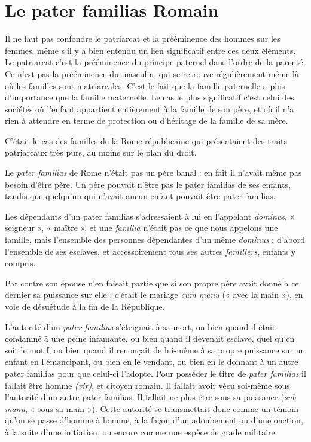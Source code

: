 \section{Le pater familias Romain}

Il ne faut pas confondre le patriarcat et la prééminence des hommes
sur les femmes, même s'il y a bien entendu un lien significatif entre
ces deux éléments. Le patriarcat c'est la prééminence du principe paternel
dans l'ordre de la parenté. Ce n'est pas la prééminence du masculin, qui
se retrouve régulièrement même là où les familles sont matriarcales. C'est
le fait que la famille paternelle a plus d'importance que la famille maternelle.
Le cas le plus significatif c'est celui des sociétés où l'enfant appartient
entièrement à la famille de son père, et où il n'a rien à attendre en
terme de protection ou d'héritage de la famille de sa mère.

C'était le cas des familles de la Rome républicaine qui présentaient
des traits patriarcaux très purs, au moins sur le plan du droit.

Le \emph{pater familias} de Rome n'était pas un père banal : en fait il n'avait
même pas besoin d'être père. Un père pouvait n'être pas le pater familias
de ses enfants, tandis que quelqu'un qui n'avait aucun enfant pouvait être
pater familias.

Les dépendants d'un pater familias s'adressaient à lui en l'appelant
\emph{dominus}, « seigneur », « maître », et une \emph{familia} n'était pas ce que nous
appelons une famille, mais l'ensemble des personnes dépendantes d'un même
\emph{dominus} : d'abord l'ensemble de ses esclaves, et accessoirement tous ses
autres \emph{familiers}, enfants y compris.

Par contre son épouse n'en faisait partie que si son propre père
avait donné à ce dernier sa puissance sur elle : c'était le mariage \emph{cum manu}
(« avec la main »), en voie de désuétude à la fin de la République.

L'autorité d'un \emph{pater familias} s'éteignait à sa mort, ou bien quand il
était condamné à une peine infamante, ou bien quand il devenait esclave,
quel qu'en soit le motif, ou bien quand il renonçait de lui-même à sa
propre puissance sur un enfant en l'émancipant, ou bien en le vendant,
ou bien en le donnant à un autre pater familias pour que celui-ci l'adopte.
Pour posséder le titre de \emph{pater familias} il fallait être homme \emph{(vir)}, et citoyen
romain. Il fallait avoir vécu soi-même sous l'autorité d'un autre pater familias.
Il fallait ne plus être sous sa puissance (\emph{sub manu}, « sous sa main »).
Cette autorité se transmettait donc comme un témoin qu'on se passe
d'homme à homme, à la façon d'un adoubement ou d'une onction, à la
suite d'une initiation, ou encore comme une espèce de grade militaire.

